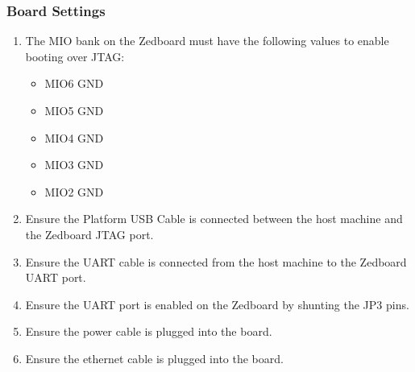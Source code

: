 \documentclass[12pt]{article}
\begin{document}
\subsubsection{Board Settings}
\begin{enumerate}
\item The MIO bank on the Zedboard must have the following values to enable booting over JTAG:
\begin{itemize}
\item MIO6 GND
\item MIO5 GND
\item MIO4 GND
\item MIO3 GND
\item MIO2 GND
\end{itemize}
\item Ensure the Platform USB Cable is connected between the host machine and the Zedboard JTAG port.
\item Ensure the UART cable is connected from the host machine to the Zedboard UART port.
\item Ensure the UART port is enabled on the Zedboard by shunting the JP3 pins.
\item Ensure the power cable is plugged into the board.
\item Ensure the ethernet cable is plugged into the board.
\end{enumerate}
\end{document}
